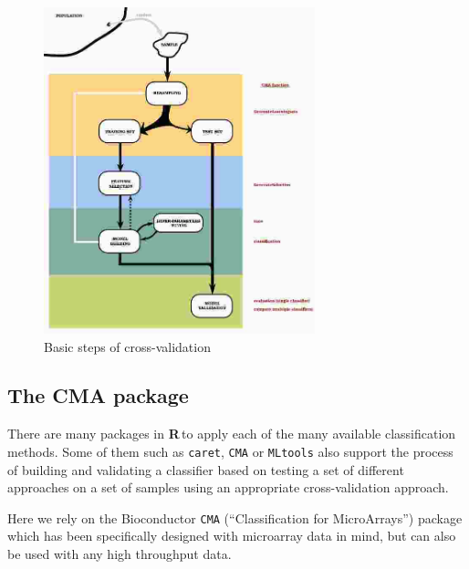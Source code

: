 \documentclass{article}\usepackage[]{graphicx}\usepackage[]{color}
\newcommand{\R}{\textbf{R}\,}
\begin{document}
\begin{figure}
\includegraphics[width=0.7\textwidth]{images/biomarkerValidationScheme}
\caption{Basic steps of cross-validation\label{validation}}
\end{figure}

\subsection{The CMA package}

There are many packages in \R to apply each of the many available
classification methods.  Some of them such as \texttt{caret}, \texttt{CMA} or \texttt{MLtools} also support the process of
building and validating a classifier based on testing a set of
different approaches on a set of samples using an appropriate
cross-validation approach. 

Here we rely on the Bioconductor \texttt{CMA} (``Classification for MicroArrays'') package which has been
specifically designed with microarray data in mind, but can also be used with any high throughput data.
\end{document}
